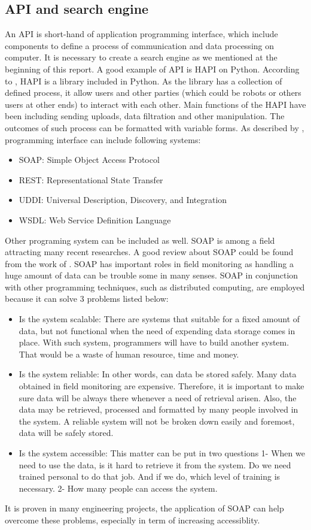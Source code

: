 \subsection{API and search engine}
An API is short-hand of  application programming interface, which include components to define a process of communication and data processing on computer. 
It is necessary to create a search engine as we mentioned at the beginning of this report.
A good example of API is HAPI on Python. 
According to \cite{Kochanov201615}, HAPI is a library included in Python. 
As the library has a collection of defined process, it allow users and other parties (which could be robots or others users at other ends) to interact with each other.
Main functions of the HAPI have been including sending uploads, data filtration and other manipulation. 
The outcomes of such process can be formatted with variable forms. 
As described by \cite{Hedbrant20162206}, programming interface can include following systems:
\begin{itemize}
	\item SOAP: Simple Object Access Protocol
	\item REST: Representational State Transfer
	\item UDDI: Universal Description, Discovery, and Integration
	\item WSDL: Web Service Definition Language
\end{itemize}
	Other programing system can be included as well. 
	SOAP is among a field attracting many recent researches. 
	A good review about SOAP could be found from the work of \cite{Hsieh2009424}. 
	SOAP has important roles in field monitoring as handling a huge amount of data can be trouble some in many senses. 
	SOAP in conjunction with other programming techniques, such as distributed computing, are employed because it can solve 3 problems listed below:
	\begin{itemize}
		\item Is the system scalable: 
		There are systems that suitable for a fixed amount of data, but not functional when the need of expending data storage comes in place. 
		With such system, programmers will have to build another system. 
		That would be a waste of human resource, time and money.
		\item Is the system reliable: 
		In other words, can data be stored safely. 
		Many data obtained in field monitoring are expensive. 
		Therefore, it is important to make sure data will be always there whenever a need of retrieval arisen. 
		Also, the data may be retrieved, processed and formatted by many people involved in the system.
		A reliable system will not be broken down easily and foremost, data will be safely stored.
		\item Is the system accessible: 
		This matter can be put in two questions 1- When we need to use the data, is it hard to retrieve it from the system. 
		Do we need trained personal to do that job.
		And if we do, which level of training is necessary. 
		2- How many people can access the system. 
		
	\end{itemize}
	It is proven in many engineering projects, the application of SOAP can help overcome these problems, especially in term of increasing accessiblity.
